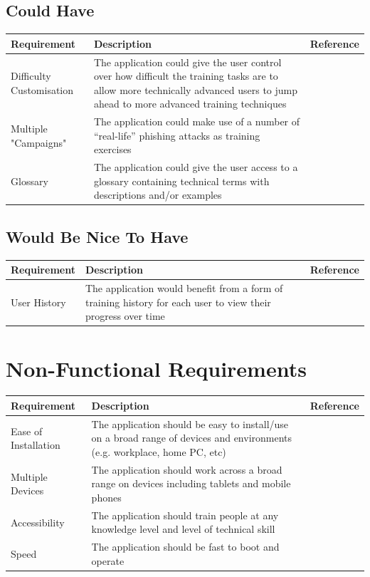 \documentclass{l4proj}
\begin{document}
\subsection{Could Have}
\begin{tabular}{ | m{10em} | m{25em}| m{5em} | } 
  \hline
  \textbf{Requirement} & \textbf{Description} & \textbf{Reference} \\ 
  \hline
  Difficulty Customisation & The application could give the user control over how difficult the training tasks are to allow more technically advanced users to jump ahead to more advanced training techniques &  \\ 
  \hline
  Multiple "Campaigns" & The application could make use of a number of “real-life” phishing attacks as training exercises  &  \\ 
  \hline
  Glossary & The application could give the user access to a glossary containing technical terms with descriptions and/or examples &  \\ 
  \hline
\end{tabular}

\subsection{Would Be Nice To Have}
\begin{tabular}{ | m{10em} | m{25em}| m{5em} | } 
  \hline
  \textbf{Requirement} & \textbf{Description} & \textbf{Reference} \\ 
  \hline
  User History & The application would benefit from a form of training history for each user to view their progress over time &  \\ 
  \hline
\end{tabular}

\section{Non-Functional Requirements}
\begin{tabular}{ | m{10em} | m{25em}| m{5em} | } 
  \hline
  \textbf{Requirement} & \textbf{Description} & \textbf{Reference} \\ 
  \hline
  Ease of Installation & The application should be easy to install/use on a broad range of devices and environments (e.g. workplace, home PC, etc) &  \\ 
  \hline
  Multiple Devices & The application should work across a broad range on devices including tablets and mobile phones &  \\ 
  \hline
  Accessibility & The application should train people at any knowledge level and level of technical skill &  \\ 
  \hline
  Speed & The application should be fast to boot and operate &  \\ 
  \hline
\end{tabular} 
\end{document}
